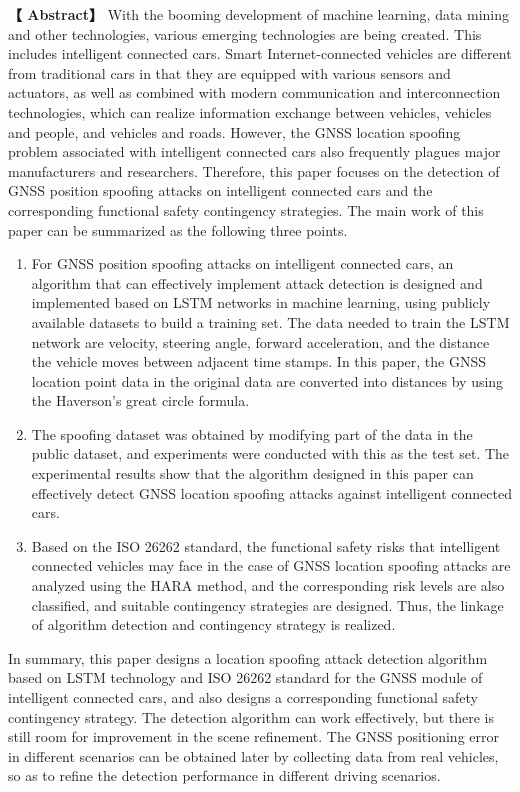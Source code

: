 \newpage

\centerline{\fangsong\bf{}}


\vskip 20bp

\hspace{4bp} {\textbf{【 Abstract】}}
With the booming development of machine learning, data mining and other technologies, various emerging technologies are being created. This includes intelligent connected cars. Smart Internet-connected vehicles are different from traditional cars in that they are equipped with various sensors and actuators, as well as combined with modern communication and interconnection technologies, which can realize information exchange between vehicles, vehicles and people, and vehicles and roads. However, the GNSS location spoofing problem associated with intelligent connected cars also frequently plagues major manufacturers and researchers. Therefore, this paper focuses on the detection of GNSS position spoofing attacks on intelligent connected cars and the corresponding functional safety contingency strategies. The main work of this paper can be summarized as the following three points.
\begin{enumerate}
    \item For GNSS position spoofing attacks on intelligent connected cars, an algorithm that can effectively implement attack detection is designed and implemented based on LSTM networks in machine learning, using publicly available datasets to build a training set. The data needed to train the LSTM network are velocity, steering angle, forward acceleration, and the distance the vehicle moves between adjacent time stamps. In this paper, the GNSS location point data in the original data are converted into distances by using the Haverson's great circle formula.
    \item The spoofing dataset was obtained by modifying part of the data in the public dataset, and experiments were conducted with this as the test set. The experimental results show that the algorithm designed in this paper can effectively detect GNSS location spoofing attacks against intelligent connected cars.
    \item Based on the ISO 26262 standard, the functional safety risks that intelligent connected vehicles may face in the case of GNSS location spoofing attacks are analyzed using the HARA method, and the corresponding risk levels are also classified, and suitable contingency strategies are designed. Thus, the linkage of algorithm detection and contingency strategy is realized.
\end{enumerate}
In summary, this paper designs a location spoofing attack detection algorithm based on LSTM technology and ISO 26262 standard for the GNSS module of intelligent connected cars, and also designs a corresponding functional safety contingency strategy. The detection algorithm can work effectively, but there is still room for improvement in the scene refinement. The GNSS positioning error in different scenarios can be obtained later by collecting data from real vehicles, so as to refine the detection performance in different driving scenarios.

